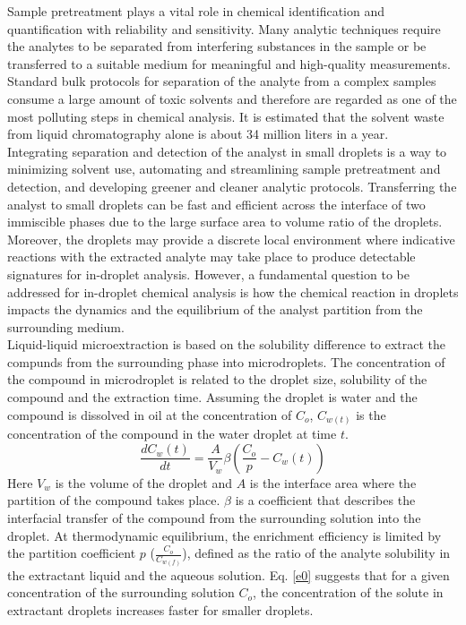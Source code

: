 \documentclass[journal=langd5,manuscript=article]{achemso}
\begin{document}
Sample pretreatment plays a vital role in chemical identification and quantification with reliability and sensitivity.  
\cite{rezaee2006dllme,yan2013dllme,alexovivc2017automation} Many analytic techniques require the analytes to be separated from interfering substances in the sample or be transferred to a suitable medium for meaningful and high-quality measurements.  Standard bulk protocols for separation of the analyte from a complex samples consume a large amount of toxic solvents and therefore are regarded as one of the most polluting steps in chemical analysis. 
It is estimated that the solvent waste from liquid chromatography alone is about 34 million
liters in a year.\cite{miller2012preparative} \\
Integrating separation and detection of the analyst in small droplets is a way to minimizing solvent use, automating and streamlining sample pretreatment and detection, and developing greener and cleaner analytic protocols. Transferring the analyst to small droplets can be fast and efficient across the interface of two immiscible phases due to the large surface area to volume ratio of the droplets. Moreover, the droplets may provide a discrete local environment where indicative reactions with the extracted analyte may take place to produce detectable signatures for in-droplet analysis. However, a fundamental question to be addressed for in-droplet chemical analysis is how the chemical reaction in droplets impacts the dynamics and the equilibrium of the analyst partition from the surrounding medium.\\
Liquid-liquid microextraction is based on the solubility difference to extract the compunds from the surrounding phase into microdroplets.\cite{comer2001lipophilicity} The concentration of the compound in  microdroplet is related to the droplet size, solubility of the compound and the extraction time.\cite{jeannot1996solvent,wei2020integrated} Assuming the droplet is water and the compound is dissolved in oil at the concentration of $C_o$, $C_{w(t)}$ is the concentration of the compound in the water droplet at time $t$.
\begin{equation}
\frac{dC_w(t)}{dt}=\frac{A}{V_w}{\beta}(\frac{C_{o}}{p}-C_w(t))%
\label{e0}
\end{equation}
Here $V_w$ is the volume of the droplet and $A$ is the interface area where the partition of the compound takes place.   $\beta$ is a coefficient that describes the interfacial transfer of the compound from the surrounding solution into the droplet.  At thermodynamic equilibrium, the enrichment efficiency is limited by the partition coefficient $p$ ($\frac{C_{o}}{C_{w(f)}}$), defined as the ratio of the analyte solubility in the extractant liquid and the aqueous solution. Eq. \ref{e0} suggests that for a given concentration of the surrounding solution $C_{o}$, the concentration of the solute in extractant droplets increases faster for smaller droplets. \\
\end{document}
